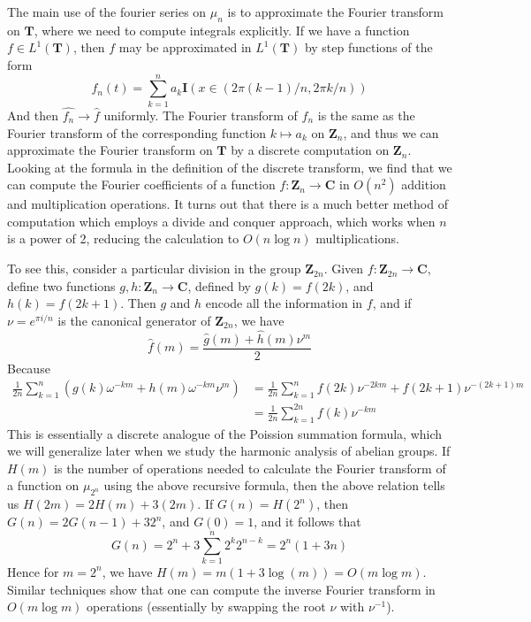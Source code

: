 The main use of the fourier series on $\mu_n$ is to approximate the Fourier transform on $\mathbf{T}$, where we need to compute integrals explicitly. If we have a function $f \in L^1(\mathbf{T})$, then $f$ may be approximated in $L^1(\mathbf{T})$ by step functions of the form
%
\[ f_n(t) = \sum_{k = 1}^{n} a_k \mathbf{I}(x \in (2 \pi (k-1) / n, 2 \pi k / n)) \]
%
And then $\hat{f_n} \to \hat{f}$ uniformly. The Fourier transform of $f_n$ is the same as the Fourier transform of the corresponding function $k \mapsto a_k$ on $\mathbf{Z}_n$, and thus we can approximate the Fourier transform on $\mathbf{T}$ by a discrete computation on $\mathbf{Z}_n$. Looking at the formula in the definition of the discrete transform, we find that we can compute the Fourier coefficients of a function $f: \mathbf{Z}_n \to \mathbf{C}$ in $O(n^2)$ addition and multiplication operations. It turns out that there is a much better method of computation which employs a divide and conquer approach, which works when $n$ is a power of 2, reducing the calculation to $O(n \log n)$ multiplications.

To see this, consider a particular division in the group $\mathbf{Z}_{2n}$. Given $f: \mathbf{Z}_{2n} \to \mathbf{C}$, define two functions $g,h: \mathbf{Z}_n \to \mathbf{C}$, defined by $g(k) = f(2k)$, and $h(k) = f(2k + 1)$. Then $g$ and $h$ encode all the information in $f$, and if $\nu = e^{\pi i/n}$ is the canonical generator of $\mathbf{Z}_{2n}$, we have
%
\[ \hat{f}(m) = \frac{\hat{g}(m) + \hat{h}(m) \nu^m}{2} \]
%
Because
%
\begin{align*}
    \frac{1}{2n} \sum_{k = 1}^{n} \left( g(k) \omega^{-km} + h(m) \omega^{-km} \nu^m \right) &= \frac{1}{2n} \sum_{k = 1}^n f(2k) \nu^{-2km} + f(2k + 1) \nu^{-(2k+1)m}\\
    &= \frac{1}{2n} \sum_{k = 1}^{2n} f(k) \nu^{-km}
\end{align*}
%
This is essentially a discrete analogue of the Poission summation formula, which we will generalize later when we study the harmonic analysis of abelian groups. If $H(m)$ is the number of operations needed to calculate the Fourier transform of a function on $\mu_{2^n}$ using the above recursive formula, then the above relation tells us $H(2m) = 2H(m) + 3 (2m)$. If $G(n) = H(2^n)$, then $G(n) = 2G(n-1) + 3 2^n$, and $G(0) = 1$, and it follows that
%
\[ G(n) = 2^n + 3 \sum_{k = 1}^n 2^{k} 2^{n-k} = 2^n(1 + 3n) \]
%
Hence for $m = 2^n$, we have $H(m) = m(1 + 3 \log (m)) = O(m \log m)$. Similar techniques show that one can compute the inverse Fourier transform in $O(m \log m)$ operations (essentially by swapping the root $\nu$ with $\nu^{-1}$).

